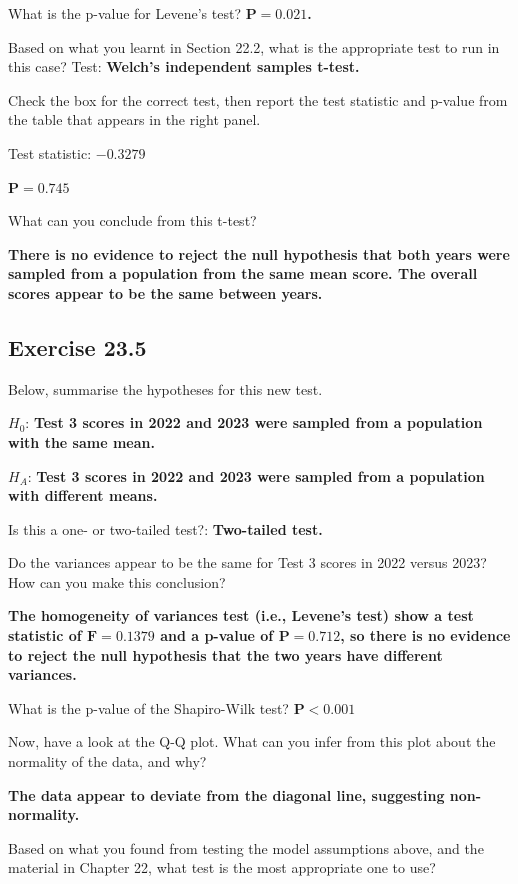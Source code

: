 \documentclass[
  openany]{krantz}
\begin{document}
What is the p-value for Levene's test? \textbf{\(\mathbf{P = 0.021}\).}

Based on what you learnt in Section 22.2, what is the appropriate test to run in this case? Test: \textbf{Welch's independent samples t-test.}

Check the box for the correct test, then report the test statistic and p-value from the table that appears in the right panel.

Test statistic: \textbf{\(\mathbf{-0.3279}\)}

\textbf{\(\mathbf{P = 0.745}\)}

What can you conclude from this t-test?

\textbf{There is no evidence to reject the null hypothesis that both years were sampled from a population from the same mean score. The overall scores appear to be the same between years.}

\hypertarget{exercise-23.5}{%
\subsection{Exercise 23.5}\label{exercise-23.5}}

Below, summarise the hypotheses for this new test.

\(H_{0}\): \textbf{Test 3 scores in 2022 and 2023 were sampled from a population with the same mean.}

\(H_{A}\): \textbf{Test 3 scores in 2022 and 2023 were sampled from a population with different means.}

Is this a one- or two-tailed test?: \textbf{Two-tailed test.}

Do the variances appear to be the same for Test 3 scores in 2022 versus 2023? How can you make this conclusion?

\textbf{The homogeneity of variances test (i.e., Levene's test) show a test statistic of \(\mathbf{F = 0.1379}\) and a p-value of \(\mathbf{P = 0.712}\), so there is no evidence to reject the null hypothesis that the two years have different variances.}

What is the p-value of the Shapiro-Wilk test? \textbf{\(\mathbf{P < 0.001}\)}

Now, have a look at the Q-Q plot. What can you infer from this plot about the normality of the data, and why?

\textbf{The data appear to deviate from the diagonal line, suggesting non-normality.}

Based on what you found from testing the model assumptions above, and the material in Chapter 22, what test is the most appropriate one to use?
\end{document}
